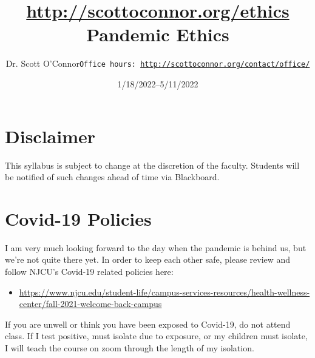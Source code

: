 \documentclass[article,oneside]{memoir}
\def\myauthor{Author}
\def\mytitle{Title}
\def\mycopyright{\myauthor}
\def\myweb{\href{http://scottoconnor.org/ethics}{http://scottoconnor.org/ethics}}
\def\myauthor{Dr. Scott O'Connor}
\def\mytitle{{\normalsize \myweb \newline} \HUGE Pandemic Ethics}
\begin{document}
\setsansfont[Mapping=tex-text]{Myriad Pro} 
\setmonofont[Mapping=tex-text,Scale=0.8]{Georgia} 

\def\ind{\hangindent=1 true cm\hangafter=1 \noindent}
\def\labelitemi{$\cdot$}


\title{\LARGE \mytitle}     
\author{\Large\myauthor \newline \footnotesize\texttt{\noindent Office hours: \href{http://scottoconnor.org/contact/office/}{http://scottoconnor.org/contact/office/}}}
\date{1/18/2022--5/11/2022}



\maketitle




%
%


\section{Disclaimer}
 This syllabus is subject to change at the discretion of the faculty. Students will be notified of such changes ahead of time via Blackboard. 

\section{Covid-19 Policies}
I am very much looking forward to the day when the pandemic is behind us, but we’re not quite there yet. In order to keep each other safe, please review and follow NJCU's Covid-19 related policies here:  
\begin{itemize}
\item \href{https://www.njcu.edu/student-life/campus-services-resources/health-wellness-center/fall-2021-welcome-back-campus}{https://www.njcu.edu/student-life/campus-services-resources/health-wellness-center/fall-2021-welcome-back-campus}
\end{itemize}
If you are unwell or think you have been exposed to Covid-19, do not attend class. If I test positive, must isolate due to exposure, or my children must isolate, I will teach the course on zoom through the length of my isolation. 
\end{document}
